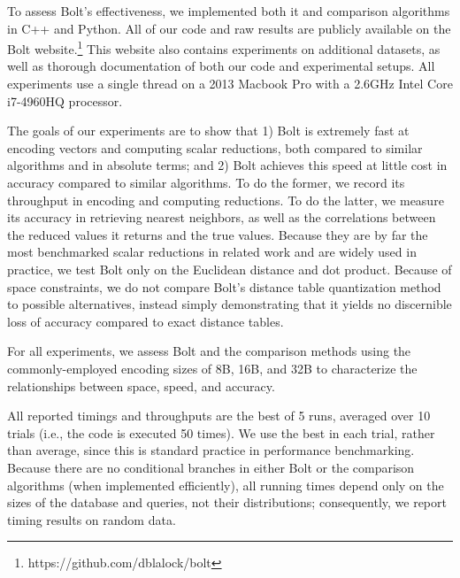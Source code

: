 
To assess Bolt's effectiveness, we implemented both it and comparison algorithms in C++ and Python. All of our code and raw results are publicly available on the Bolt website.\footnote{https://github.com/dblalock/bolt} This website also contains experiments on additional datasets, as well as thorough documentation of both our code and experimental setups. All experiments use a single thread on a 2013 Macbook Pro with a 2.6GHz Intel Core i7-4960HQ processor. %

The goals of our experiments are to show that 1) Bolt is extremely fast at encoding vectors and computing scalar reductions, both compared to similar algorithms and in absolute terms; and 2) Bolt achieves this speed at little cost in accuracy compared to similar algorithms. To do the former, we record its throughput in encoding and computing reductions. To do the latter, we measure its accuracy in retrieving nearest neighbors, as well as the correlations between the reduced values it returns and the true values. Because they are by far the most benchmarked scalar reductions in related work and are widely used in practice, we test Bolt only on the Euclidean distance and dot product. Because of space constraints, we do not compare Bolt's distance table quantization method to possible alternatives, instead simply demonstrating that it yields no discernible loss of accuracy compared to exact distance tables.

For all experiments, we assess Bolt and the comparison methods using the commonly-employed encoding sizes of 8B, 16B, and 32B to characterize the relationships between space, speed, and accuracy. %

All reported timings and throughputs are the best of 5 runs, averaged over 10 trials (i.e., the code is executed 50 times). We use the best in each trial, rather than average, since this is standard practice in performance benchmarking. Because there are no conditional branches in either Bolt or the comparison algorithms (when implemented efficiently), all running times depend only on the sizes of the database and queries, not their distributions; consequently, we report timing results on random data.

\vspace{-2mm}
